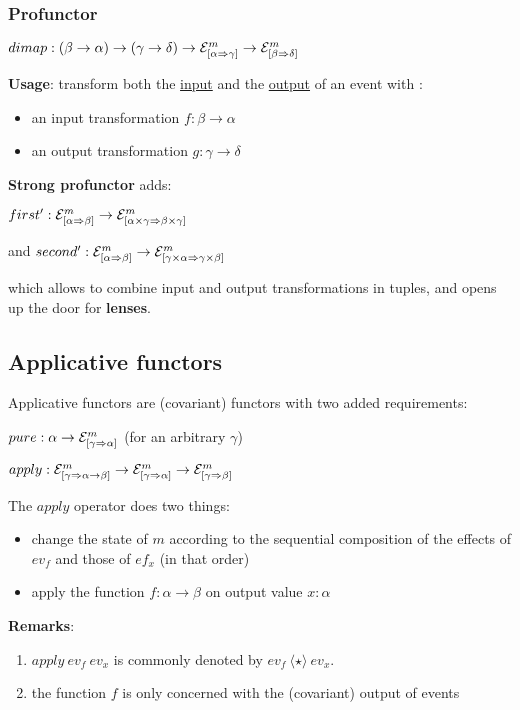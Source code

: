 \documentclass{article}
\newcommand{\EV}[3]{\ensuremath{{\cal{E}}^{#1}_{[#2 \Rightarrow #3]}}}
\newcommand{\APPLY}{\ensuremath{\langle \star \rangle}}
\begin{document}
\subsubsection*{Profunctor}

$dimap: (\beta \rightarrow \alpha) \rightarrow (\gamma \rightarrow \delta) \rightarrow  \EV{m}{\alpha}{\gamma} \rightarrow \EV{m}{\beta}{\delta}$

\textbf{Usage}: transform both the \underline{input} and the \underline{output} of an event with :
\begin{itemize}
\item an input transformation $f : \beta \rightarrow \alpha$
\item an output transformation $g : \gamma \rightarrow \delta$
\end{itemize}

\textbf{Strong profunctor} adds:

$first' : \EV{m}{\alpha}{\beta} \rightarrow \EV{m}{\alpha \times \gamma}{\beta \times \gamma}$

and $second' : \EV{m}{\alpha}{\beta} \rightarrow \EV{m}{\gamma \times \alpha}{\gamma \times \beta}$

which allows to combine input and output transformations in tuples, and opens up the door for \textbf{lenses}.

\subsection{Applicative functors}

Applicative functors are (covariant) functors with two added requirements:

$pure: \alpha \rightarrow \EV{m}{\gamma}{\alpha}$  (for an arbitrary $\gamma$)

$apply: \EV{m}{\gamma}{\alpha \rightarrow \beta} \rightarrow \EV{m}{\gamma}{\alpha} \rightarrow \EV{m}{\gamma}{\beta}$


The $apply$ operator does two things:

\begin{itemize}
\item change the state of $m$ according to the sequential composition of the effects of $ev_f$ and those of $ef_x$  (in that order)
\item apply the function $f : \alpha \rightarrow \beta$ on output value $x : \alpha$
\end{itemize}

\textbf{Remarks}:
\begin{enumerate}
\item $apply~ev_f~ev_x$ is commonly denoted by $ev_f~\APPLY~ev_x$.
\item the function $f$ is only concerned with the (covariant) output of events
\end{enumerate}
\end{document}
